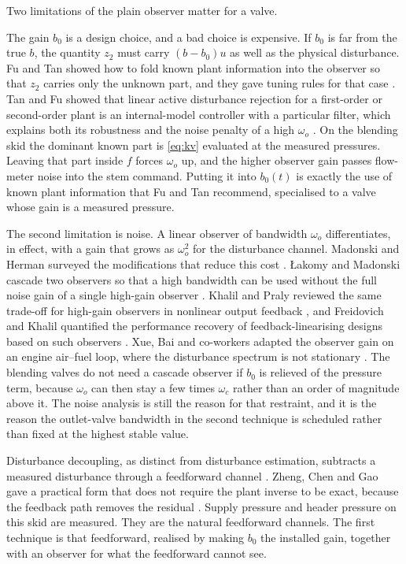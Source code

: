Two limitations of the plain observer matter for a valve.

The gain $b_0$ is a design choice, and a bad choice is expensive. If $b_0$ is far from the true $b$, the quantity $z_2$ must carry $(b-b_0)u$ as well as the physical disturbance. Fu and Tan showed how to fold known plant information into the observer so that $z_2$ carries only the unknown part, and they gave tuning rules for that case \cite{fu2016tuning}. Tan and Fu showed that linear active disturbance rejection for a first-order or second-order plant is an internal-model controller with a particular filter, which explains both its robustness and the noise penalty of a high $\omega_o$ \cite{tan2016imc,rivera1986imc}. On the blending skid the dominant known part is \eqref{eq:kv} evaluated at the measured pressures. Leaving that part inside $f$ forces $\omega_o$ up, and the higher observer gain passes flow-meter noise into the stem command. Putting it into $b_0(t)$ is exactly the use of known plant information that Fu and Tan recommend, specialised to a valve whose gain is a measured pressure.

The second limitation is noise. A linear observer of bandwidth $\omega_o$ differentiates, in effect, with a gain that grows as $\omega_o^2$ for the disturbance channel. Madonski and Herman surveyed the modifications that reduce this cost \cite{madonski2015survey}. \L{}akomy and Madonski cascade two observers so that a high bandwidth can be used without the full noise gain of a single high-gain observer \cite{lakomy2021cascade}. Khalil and Praly reviewed the same trade-off for high-gain observers in nonlinear output feedback \cite{khalil2014highgain,khalil2002nonlinear}, and Freidovich and Khalil quantified the performance recovery of feedback-linearising designs based on such observers \cite{freidovich2008performance}. Xue, Bai and co-workers adapted the observer gain on an engine air--fuel loop, where the disturbance spectrum is not stationary \cite{xue2015airfuel}. The blending valves do not need a cascade observer if $b_0$ is relieved of the pressure term, because $\omega_o$ can then stay a few times $\omega_c$ rather than an order of magnitude above it. The noise analysis is still the reason for that restraint, and it is the reason the outlet-valve bandwidth in the second technique is scheduled rather than fixed at the highest stable value.

Disturbance decoupling, as distinct from disturbance estimation, subtracts a measured disturbance through a feedforward channel \cite{zheng2009decoupling,luyben1990process}. Zheng, Chen and Gao gave a practical form that does not require the plant inverse to be exact, because the feedback path removes the residual \cite{zheng2009decoupling}. Supply pressure and header pressure on this skid are measured. They are the natural feedforward channels. The first technique is that feedforward, realised by making $b_0$ the installed gain, together with an observer for what the feedforward cannot see.

